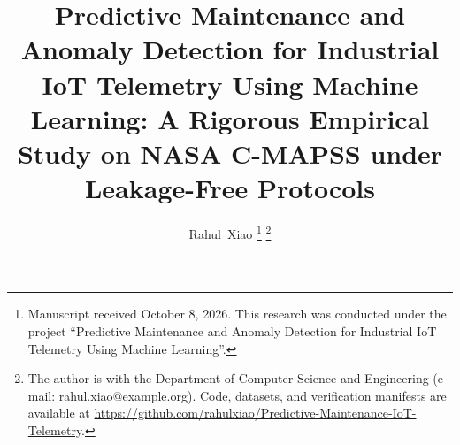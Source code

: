 \documentclass[journal,10pt,twocolumn]{IEEEtran}
\title{Predictive Maintenance and Anomaly Detection for Industrial IoT Telemetry Using Machine Learning: A Rigorous Empirical Study on NASA C-MAPSS under Leakage-Free Protocols}
\author{Rahul~Xiao%
\thanks{Manuscript received October 8, 2026. This research was conducted under the project ``Predictive Maintenance and Anomaly Detection for Industrial IoT Telemetry Using Machine Learning''.}%
\thanks{The author is with the Department of Computer Science and Engineering (e-mail: rahul.xiao@example.org). Code, datasets, and verification manifests are available at \url{https://github.com/rahulxiao/Predictive-Maintenance-IoT-Telemetry}.}%
}
\begin{document}
\maketitle












\appendices




\end{document}
